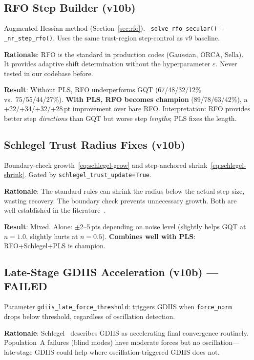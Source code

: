 \documentclass[11pt,a4paper]{article}
\theoremstyle{definition}
\begin{document}
\subsection{RFO Step Builder (v10b)}

Augmented Hessian method (Section~\ref{sec:rfo}).
\texttt{\_solve\_rfo\_secular()} + \texttt{\_nr\_step\_rfo()}.
Uses the same trust-region step-control as v9 baseline.

\textbf{Rationale}: RFO is the standard in production codes (Gaussian, ORCA,
Sella).  It provides adaptive shift determination without the hyperparameter
$\varepsilon$.  Never tested in our codebase before.

\textbf{Result}: Without PLS, RFO underperforms GQT (67/48/32/12\% vs.\
75/55/44/27\%).  \textbf{With PLS, RFO becomes champion}
(89/78/63/42\%), a +22/+34/+32/+28\,pt improvement over bare RFO.
Interpretation: RFO provides better step \emph{directions} than GQT
but worse step \emph{lengths}; PLS fixes the length.

\subsection{Schlegel Trust Radius Fixes (v10b)}

Boundary-check growth~\eqref{eq:schlegel-grow} and step-anchored
shrink~\eqref{eq:schlegel-shrink}.  Gated by
\texttt{schlegel\_trust\_update=True}.

\textbf{Rationale}: The standard rules can shrink the radius below the
actual step size, wasting recovery.  The boundary check prevents
unnecessary growth.  Both are well-established in the
literature~\citep{schlegel2011}.

\textbf{Result}: Mixed.  Alone: $\pm$2--5\,pts depending on noise level
(slightly helps GQT at $n=1.0$, slightly hurts at $n=0.5$).
\textbf{Combines well with PLS}: RFO+Schlegel+PLS is champion.

\subsection{Late-Stage GDIIS Acceleration (v10b) --- FAILED}

Parameter \texttt{gdiis\_late\_force\_threshold}: triggers GDIIS
when \texttt{force\_norm} drops below threshold, regardless of oscillation
detection.

\textbf{Rationale}: Schlegel~\citep{schlegel2011} describes GDIIS as
accelerating final convergence routinely.  Population~A failures (blind
modes) have moderate forces but no oscillation---late-stage GDIIS could
help where oscillation-triggered GDIIS does not.
\end{document}
